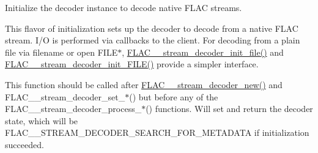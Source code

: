 Initialize the decoder instance to decode native F\+L\+AC streams.

This flavor of initialization sets up the decoder to decode from a native F\+L\+AC stream. I/O is performed via callbacks to the client. For decoding from a plain file via filename or open F\+I\+L\+E$\ast$, \hyperlink{group__flac__stream__decoder_ga1692108a97012d1c5f79baf7df012c33}{F\+L\+A\+C\+\_\+\+\_\+stream\+\_\+decoder\+\_\+init\+\_\+file()} and \hyperlink{group__flac__stream__decoder_ga38f9eb46bf112af205f86b4cbac9980c}{F\+L\+A\+C\+\_\+\+\_\+stream\+\_\+decoder\+\_\+init\+\_\+\+F\+I\+L\+E()} provide a simpler interface.

This function should be called after \hyperlink{group__flac__stream__decoder_ga7159eefc074dfbab4a37462f69326091}{F\+L\+A\+C\+\_\+\+\_\+stream\+\_\+decoder\+\_\+new()} and F\+L\+A\+C\+\_\+\+\_\+stream\+\_\+decoder\+\_\+set\+\_\+$\ast$() but before any of the F\+L\+A\+C\+\_\+\+\_\+stream\+\_\+decoder\+\_\+process\+\_\+$\ast$() functions. Will set and return the decoder state, which will be F\+L\+A\+C\+\_\+\+\_\+\+S\+T\+R\+E\+A\+M\+\_\+\+D\+E\+C\+O\+D\+E\+R\+\_\+\+S\+E\+A\+R\+C\+H\+\_\+\+F\+O\+R\+\_\+\+M\+E\+T\+A\+D\+A\+TA if initialization succeeded.


